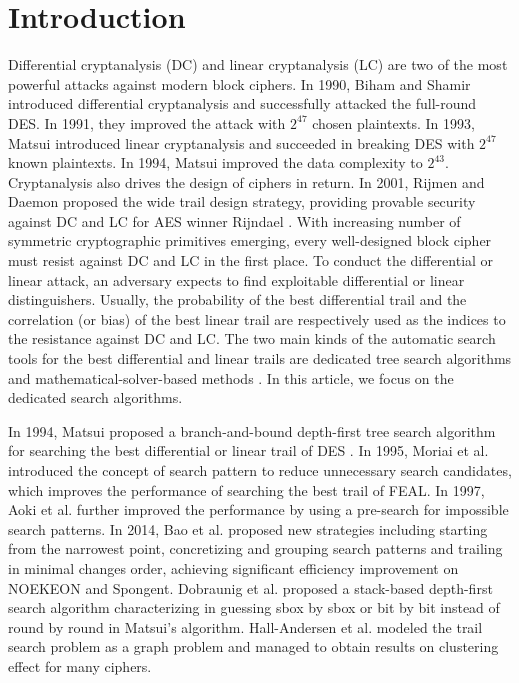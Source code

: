 \section{Introduction}

Differential cryptanalysis (DC) \cite{BS91,BS92} and linear cryptanalysis (LC) \cite{M93,M94_1} are two of the most powerful attacks against modern block ciphers. In 1990, Biham and Shamir \cite{BS92} introduced differential cryptanalysis and successfully attacked the full-round DES. In 1991, they \cite{BS92} improved the attack with $2^{47}$ chosen plaintexts. In 1993, Matsui \cite{M93} introduced linear cryptanalysis and succeeded in breaking DES with $2^{47}$ known plaintexts. In 1994, Matsui \cite{M94_1} improved the data complexity to $2^{43}$. Cryptanalysis also drives the design of ciphers in return. In 2001, Rijmen and Daemon \cite{DR01} proposed the wide trail design strategy, providing provable security against DC and LC for AES winner Rijndael \cite{DR98}. With increasing number of symmetric cryptographic primitives emerging, every well-designed block cipher must resist against DC and LC in the first place. To conduct the differential or linear attack, an adversary expects to find exploitable differential or linear distinguishers. Usually, the probability of the best differential trail and the correlation (or bias) of the best linear trail are respectively used as the indices to the resistance against DC and LC. The two main kinds of the automatic search tools for the best differential and linear trails are dedicated tree search algorithms \cite{M94_2,OMA95,AKM97,BZL14} and mathematical-solver-based methods \cite{MWG12,SHW14-1,SHW14-2,ZZDX19}. In this article, we focus on the dedicated search algorithms. 

In 1994, Matsui proposed a branch-and-bound depth-first tree search algorithm for searching the best differential or linear trail of DES \cite{M94_2}. In 1995, Moriai et al. \cite{OMA95} introduced the concept of search pattern to reduce unnecessary search candidates, which improves the performance of searching the best trail of FEAL. In 1997, Aoki et al. \cite{AKM97} further improved the performance by using a pre-search for impossible search patterns. In 2014, Bao et al. \cite{BZL14} proposed new strategies including starting from the narrowest point, concretizing and grouping search patterns and trailing in minimal changes order, achieving significant efficiency improvement on NOEKEON and Spongent. Dobraunig et al. \cite{DEM15} proposed a stack-based depth-first search algorithm characterizing in guessing sbox by sbox or bit by bit instead of round by round in Matsui's algorithm. Hall-Andersen et al. \cite{HV18} modeled the trail search problem as a graph problem and managed to obtain results on clustering effect for many ciphers. 

